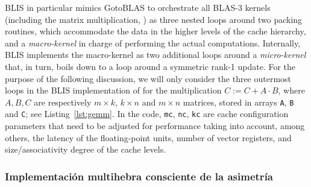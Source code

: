 
BLIS in particular mimics GotoBLAS to orchestrate all BLAS-3 kernels (including the matrix multiplication, \gemm) as three nested loops
around two packing routines, which accommodate the data in the higher levels of the cache hierarchy,
and a {\em macro-kernel} in charge of performing the actual computations.
Internally, BLIS implements the macro-kernel as two additional loops around a {\em micro-kernel} that, in turn,
boils down to a loop around a symmetric rank-1 update. For the purpose of the following discussion, we will only consider the three outermost loops 
in the BLIS implementation of \gemm for the multiplication
$C:=C+A\cdot B$, where $A,B,C$ are respectively $m \times k$, $k\times n$ and $m \times n$ matrices, stored
in arrays {\tt A}, {\tt B} and {\tt C}; see Listing~\ref{lst:gemm}.
In the code, {\tt mc}, {\tt nc}, {\tt kc} are cache configuration parameters that need to be adjusted for performance taking
into account, among others, the latency of the floating-point units, number of vector
registers, and size/associativity degree of the cache levels.


%


\subsubsection{Implementación multihebra consciente de la asimetría}

